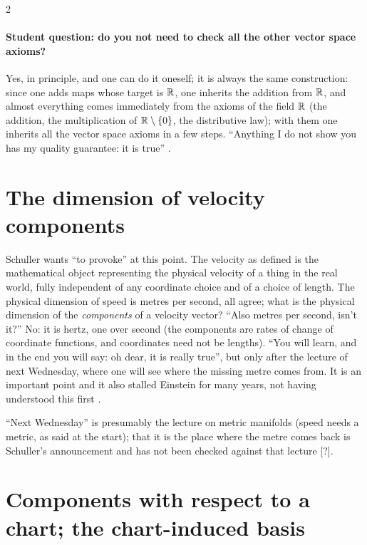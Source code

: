 \begin{paracol}{2}
\paragraph{Student question: do you not need to check all the other vector space axioms?} Yes, in principle, and one can do it oneself; it is always the same construction: since one adds maps whose target is $\mathbb{R}$, one inherits the addition from $\mathbb{R}$, and almost everything comes immediately from the axioms of the field $\mathbb{R}$ (the addition, the multiplication of $\mathbb{R}\setminus\{0\}$, the distributive law); with them one inherits all the vector space axioms in a few steps. ``Anything I do not show you has my quality guarantee: it is true''
.

\section{The dimension of velocity components}\label{sec:c05-dimension}

\begin{aside}
Schuller wants ``to provoke'' at this point. The velocity as defined is the mathematical object representing the physical velocity of a thing in the real world, fully independent of any coordinate choice and of a choice of length. The physical dimension of speed is metres per second, all agree; what is the physical dimension of the \emph{components} of a velocity vector? ``Also metres per second, isn't it?'' No: it is hertz, one over second
(the components are rates of change of coordinate functions, and coordinates need not be lengths). ``You will learn, and in the end you will say: oh dear, it is really true'', but only after the lecture of next Wednesday, where one will see where the missing metre comes from. It is an important point and it also stalled Einstein for many years, not having understood this first .
\end{aside}
\begin{coursenote}
``Next Wednesday'' is presumably the lecture on metric manifolds (speed needs a metric, as said at the start); that it is the place where the metre comes back is Schuller's announcement and has not been checked against that lecture [?].
\end{coursenote}

\section{Components with respect to a chart; the chart-induced basis}\label{sec:c05-components}


\end{paracol}
